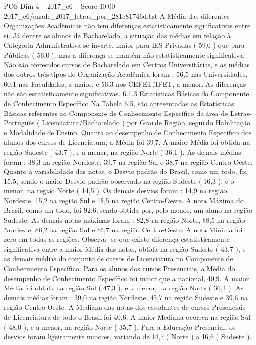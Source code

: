 \begin{textsample}{POS Dim 4 – 2017\_c6 – Score 10.00 – 2017\_c6/enade\_2017\_letras\_por\_281c81746d.txt}
A Média das diferentes Organizações Acadêmicas não tem diferenças estatisticamente significativas entre si.
Já dentre os alunos de Bacharelado, a situação das médias em relação à Categoria Administrativa se inverte, maior para IES Privadas ( 59,0 ) que para Públicas ( 56,0 ), mas a diferença se mantém não estatisticamente significativa.
Não são oferecidos cursos de Bacharelado em Centros Universitários, e as médias dos outros três tipos de Organização Acadêmica foram : 56,5 nas Universidades, 60,1 nas Faculdades, a maior, e 56,3 nos CEFET/IFET, a menor.
As diferenças não são estatisticamente significativas. 6.1.3 Estatísticas Básicas do Componente de Conhecimento Específico Na Tabela 6.5, são apresentadas as Estatísticas Básicas referentes ao Componente de Conhecimento Específico da área de Letras-Português ( Licenciatura/Bacharelado ) por Grande Região, segundo Habilitação e Modalidade de Ensino.
Quanto ao desempenho de Conhecimento Específico dos alunos dos cursos de Licenciatura, a Média foi 39,7.
A maior Média foi obtida na região Sudeste ( 43,7 ), e a menor, na região Norte ( 36,1 ).
As demais médias foram : 38,3 na região Nordeste, 39,7 na região Sul e 38,7 na região Centro-Oeste.
Quanto à variabilidade das notas, o Desvio padrão do Brasil, como um todo, foi 15,5, sendo o maior Desvio padrão observado na região Sudeste ( 16,3 ), e o menor, na região Norte ( 14,5 ).
Os demais desvios foram : 14,9 na região Nordeste, 15,2 na região Sul e 15,5 na região Centro-Oeste.
A nota Máxima do Brasil, como um todo, foi 92,6, sendo obtida por, pelo menos, um aluno na região Sudeste.
As demais notas máximas foram : 82,8 na região Norte, 88,5 na região Nordeste, 86,2 na região Sul e 82,7 na região Centro-Oeste.
A nota Mínima foi zero em todas as regiões.
Observa -se que existe diferença estatisticamente significativa entre a maior Média das notas, obtida na região Sudeste ( 43,7 ), e as demais médias do conjunto de cursos de Licenciatura no Componente de Conhecimento Específico.
Para os alunos dos cursos Presenciais, a Média do desempenho de Conhecimento Específico foi maior que a nacional, 40,9.
A maior Média foi obtida na região Sul ( 47,3 ), e a menor, na região Norte ( 36,4 ).
As demais médias foram : 39,0 na região Nordeste, 45,7 na região Sudeste e 39,6 na região Centro-Oeste.
A Mediana das notas dos estudantes de cursos Presenciais de Licenciatura de todo o Brasil foi 40,6.
A maior Mediana ocorreu na região Sul ( 48,0 ), e a menor, na região Norte ( 35,7 ).
Para a Educação Presencial, os desvios foram ligeiramente maiores, variando de 14,7 ( Norte ) a 16,6 ( Sudeste ).

\end{textsample}

